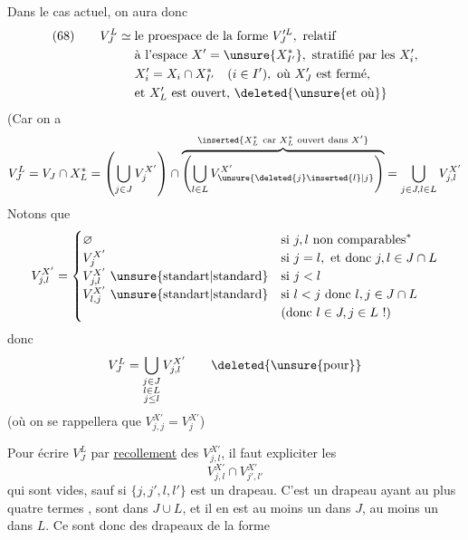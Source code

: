 
Dans le cas actuel, on aura donc
\[
\begin{aligned}
(68)\qquad V_J^L\simeq{}&\text{le proespace de la forme }V_J^{\prime L},\text{ relatif}\\
&\text{à l'espace }X'=\unsure{X_{I'}^*},\text{ stratifié par les }X_i',\\
&X_i'=X_i\cap X_{I'}^*\quad(i\in I'),\text{ où }X_J'\text{ est fermé,}\\
&\text{et }X_L'\text{ est ouvert, }\deleted{\unsure{\text{et où}}}
\end{aligned}
\]
(Car on a
\[
V_J^L=V_J\cap X_L^*
=\left(\bigcup_{j\in J}V_j^{X'}\right)\cap
\overbrace{\left(\bigcup_{l\in L}V_{\unsure{\deleted{j}\inserted{l}|j}}^{X'}\right)}^{\inserted{X_L^*\ \text{car }X_L^*\text{ ouvert dans }X'}}
=\bigcup_{j\in J,l\in L}V_{j,l}^{X'}
\]
Notons que
\[
V_{j,l}^{X'}=
\begin{cases}
\varnothing&\text{si }j,l\text{ non comparables}^*\\
V_j^{X'}&\text{si }j=l,\text{ et donc }j,l\in J\cap L\\
V_{j,l}^{X'}\ \text{\unsure{standart|standard}}&\text{si }j<l\\
V_{l,j}^{X'}\ \text{\unsure{standart|standard}}&\text{si }l<j\text{ donc }l,j\in J\cap L\\
&\text{(donc }l\in J,j\in L\text{ !)}
\end{cases}
\]
donc
\[
V_J^L=\bigcup_{\substack{j\in J\\l\in L\\j\leq l}}V_{j,l}^{X'}\qquad\deleted{\text{\unsure{pour}}}
\]
(où on se rappellera que $V_{j,j}^{X'}=V_j^{X'}$)


Pour écrire $V_J^L$ par \uline{recollement} des $V_{j,l}^{X'}$, il faut expliciter les
\[
V_{j,l}^{X'}\cap V_{j',l'}^{X'}
\]
qui sont vides, sauf si $\{j,j',l,l'\}$ est un drapeau. C'est un drapeau  ayant au plus quatre termes ,   sont dans $J\cup L$, et il en est au  moins un dans $J$, au moins un dans $L$. Ce sont donc des drapeaux de la forme
